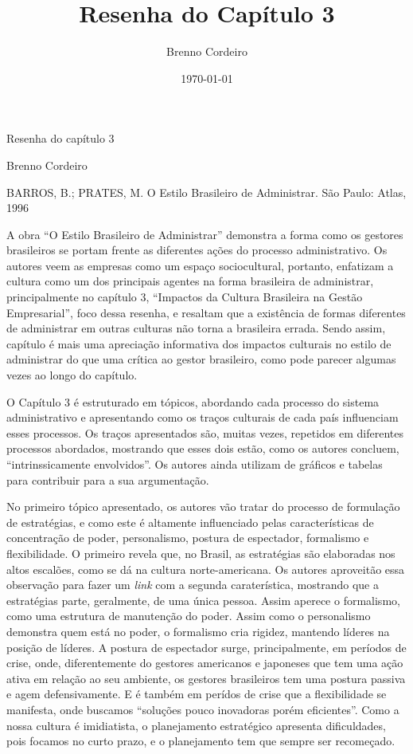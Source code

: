 \documentclass[11pt, a4paper]{article}
\title{Resenha do Capítulo 3}
\author{Brenno Cordeiro}
\date{\today}
\begin{document}

{\Large Resenha do capítulo 3}

{\large Brenno Cordeiro}


BARROS, B.; PRATES, M. O Estilo Brasileiro de Administrar. São Paulo: Atlas, 1996

A obra ``O Estilo Brasileiro de Administrar'' demonstra a forma como os gestores brasileiros se portam frente as diferentes ações do processo administrativo. Os autores veem as empresas como um espaço sociocultural, portanto,  enfatizam a cultura como um dos principais agentes na forma brasileira de administrar, principalmente no capítulo 3, ``Impactos da Cultura Brasileira na Gestão Empresarial'', foco dessa resenha, e resaltam que a existência de formas diferentes de administrar em outras culturas não torna a brasileira errada. Sendo assim, capítulo é mais uma
apreciação informativa dos impactos culturais no estilo de administrar do que uma crítica ao gestor brasileiro, como pode parecer algumas vezes ao longo do capítulo.

O Capítulo 3 é estruturado em tópicos, abordando cada processo do sistema administrativo e apresentando como os traços culturais de cada país influenciam esses processos. Os traços apresentados são, muitas vezes, repetidos em diferentes processos abordados, mostrando que esses dois estão, como os autores concluem, ``intrinssicamente envolvidos''. Os autores ainda utilizam de gráficos e tabelas para contribuir para a sua argumentação.

No primeiro tópico apresentado, os autores vão tratar do processo de formulação de estratégias, e como este é altamente influenciado pelas características de concentração de poder, personalismo, postura de espectador, formalismo e flexibilidade. O primeiro revela que, no Brasil, as estratégias são elaboradas nos altos escalões, como se dá na cultura norte-americana. Os autores aproveitão essa observação para fazer um \emph{link} com a segunda caraterística, mostrando que a estratégias parte, geralmente, de uma única pessoa. Assim aperece o formalismo, como uma estrutura de manutenção do poder. Assim como o personalismo demonstra quem está no poder, o formalismo cria rigidez, mantendo líderes na posição de líderes. A postura de espectador surge, principalmente, em períodos de crise, onde, diferentemente do gestores americanos e japoneses que tem uma ação ativa em relação ao seu ambiente, os gestores brasileiros tem uma postura passiva e agem defensivamente. E é também em perídos de crise que a flexibilidade se manifesta, onde buscamos ``soluções pouco inovadoras porém eficientes''. Como a nossa cultura é imidiatista, o planejamento estratégico apresenta dificuldades, pois focamos no curto prazo, e o planejamento tem que sempre ser recomeçado.
\end{document}
